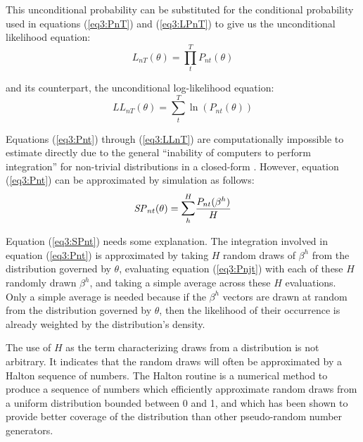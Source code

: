 \documentclass[../main.tex]{subfiles}
\begin{document}
This unconditional probability can be substituted for the conditional probability used in equations (\ref{eq3:PnT}) and (\ref{eq3:LPnT}) to give us the unconditional likelihood equation:
\begin{equation}
	\label{eq3:LnT}
	L_{nT}(\theta) = \prod_t^T P_{nt}(\theta)
\end{equation}

\noindent and its counterpart, the unconditional log-likelihood equation:
\begin{equation}
	\label{eq3:LLnT}
	\mathit{LL}_{nT}(\theta) = \sum_t^T \ln \left( P_{nt}(\theta) \right)
\end{equation}

Equations (\ref{eq3:Pnt}) through (\ref{eq3:LLnT}) are computationally impossible to estimate directly due to the general \enquote{inability of computers to perform integration} for non-trivial distributions in a closed-form \parencite[2]{Train2002}.
However, equation (\ref{eq3:Pnt}) can be approximated by simulation as follows:
\begin{equation}
	\label{eq3:SPnt}
	\mathit{SP}_{nt}(\theta) = \mathlarger{\sum}_h^H \frac{ P_{nt}(\beta^h) }{H}
\end{equation}

Equation (\ref{eq3:SPnt}) needs some explanation.
The integration involved in equation (\ref{eq3:Pnt}) is approximated by taking $H$ random draws of $\beta^h$ from the distribution governed by $\theta$, evaluating equation (\ref{eq3:Pnjt}) with each of these $H$ randomly drawn $\beta^h$, and taking a simple average across these $H$ evaluations.
Only a simple average is needed because if the $\beta^h$ vectors are drawn at random from the distribution governed by $\theta$, then the likelihood of their occurrence is already weighted by the distribution's density.

The use of $H$ as the term characterizing draws from a distribution is not arbitrary.
It indicates that the random draws will often be approximated by a Halton sequence of numbers.
The Halton routine is a numerical method to produce a sequence of numbers which efficiently approximate random draws from a uniform distribution bounded between 0 and 1, and which has been shown to provide better coverage of the distribution than other pseudo-random{\footnotemark} number generators.{\footnotemark}
\end{document}
